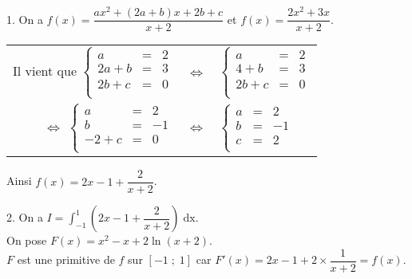 1. On a $f(x) = \dfrac{ax^2 + \left(2a + b\right)x + 2b + c}{x+2}$ et $f(x) = \dfrac{2x^2 + 3x}{x+2}$. \\

\vspace*{.3cm}

\begin{tabular}{rll}
Il vient que $\left\{
  \begin{array}{rll}
    a & = & 2 \\
    2a + b & = & 3 \\
    2b + c & = & 0 \\
  \end{array}
\right.$
& $\Longleftrightarrow$ & 
$\left\{
  \begin{array}{rll}
    a & = & 2 \\
    4 + b & = & 3 \\
    2b + c & = & 0 \\
  \end{array}
\right.$ \vspace*{.3cm} \\
\vspace*{.3cm} $\Longleftrightarrow$
$\left\{
  \begin{array}{rll}
    a & = & 2 \\
    b & = & -1 \\
    -2 + c & = & 0 \\
  \end{array}
\right.$ & $\Longleftrightarrow$ & 
$\left\{
  \begin{array}{rll}
    a & = & 2 \\
    b & = & -1 \\
    c & = & 2 \\
  \end{array}
\right.$ \\
\end{tabular}

\vspace*{.2cm}

Ainsi $f(x) = 2x - 1 + \dfrac{2}{x+2}$. 

\vspace*{.3cm}

2. On a $I = \displaystyle \int_{-1}^1 \left(2x - 1 + \dfrac{2}{x+2}\right) \; \mathrm{dx}$. \\

On pose $F(x) = x^2 - x + 2\ln \left(x+2\right)$. \\

$F$ est une primitive de $f$ sur $\left[-1 \; ; \; 1\right]$ car $F'(x) = 2x - 1 + 2 \times \dfrac{1}{x+2} = f(x)$. \\

